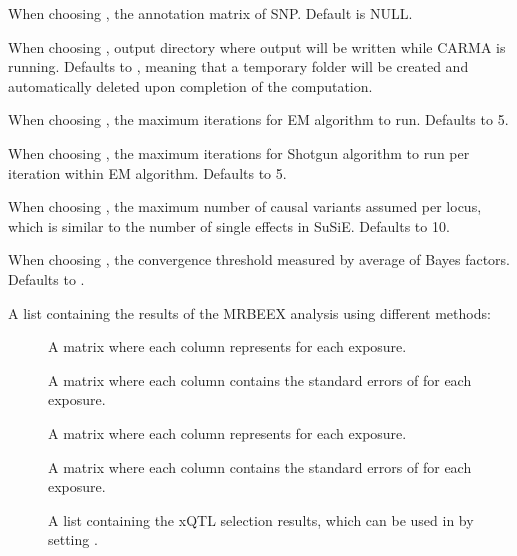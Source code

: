 \documentclass[a4paper]{book}
\begin{document}
\begin{Arguments}
\begin{ldescription}
\item[\code{Annotation}] When choosing , the annotation matrix of SNP. Default is NULL.

\item[\code{output.labels}] When choosing , output directory where output will be written while CARMA is running. Defaults to , meaning that a temporary folder will be created and automatically deleted upon completion of the computation.

\item[\code{carma.iter}] When choosing , the maximum iterations for EM algorithm to run. Defaults to 5.

\item[\code{carma.inner.iter}] When choosing , the maximum iterations for Shotgun algorithm to run per iteration within EM algorithm. Defaults to 5.

\item[\code{xQTL.max.num}] When choosing , the maximum number of causal variants assumed per locus, which is similar to the number of single effects in SuSiE. Defaults to 10.

\item[\code{carma.epsilon.threshold}] When choosing , the convergence threshold measured by average of Bayes factors. Defaults to .
\end{ldescription}
\end{Arguments}
%
\begin{Value}
A list containing the results of the MRBEEX analysis using different methods:
\begin{description}

\item[] A matrix where each column represents  for each exposure.
\item[] A matrix where each column contains the standard errors of  for each exposure.
\item[] A matrix where each column represents  for each exposure.
\item[] A matrix where each column contains the standard errors of  for each exposure.
\item[] A list containing the xQTL selection results, which can be used in  by setting .

\end{description}

\end{Value}
\end{document}
